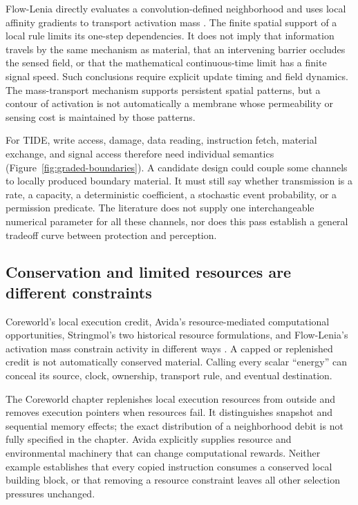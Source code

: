 Flow-Lenia directly evaluates a convolution-defined neighborhood and uses
local affinity gradients to transport activation mass
\citep{Plantec2025}. The finite spatial support of a local rule limits its
one-step dependencies. It does not imply that information travels by the same
mechanism as material, that an intervening barrier occludes the sensed field,
or that the mathematical continuous-time limit has a finite signal speed.
Such conclusions require explicit update timing and field dynamics. The
mass-transport mechanism supports persistent spatial patterns, but a contour
of activation is not automatically a membrane whose permeability or sensing
cost is maintained by those patterns.

For TIDE, write access, damage, data reading, instruction fetch, material
exchange, and signal access therefore need individual semantics
(Figure~\ref{fig:graded-boundaries}). A candidate design could couple some
channels to locally produced boundary material. It must still say whether
transmission is a rate, a capacity, a deterministic coefficient, a stochastic
event probability, or a permission predicate. The literature does not supply
one interchangeable numerical parameter for all these channels, nor does this
pass establish a general tradeoff curve between protection and perception.

\subsection{Conservation and limited resources are different constraints}
Coreworld's local execution credit, Avida's resource-mediated computational
opportunities, Stringmol's two historical resource formulations, and
Flow-Lenia's activation mass constrain activity in different ways
\citep{Rasmussen1991,OfriaWilke2004,StringmolSpec2010,Hickinbotham2021,Plantec2025}.
A capped or replenished credit is not automatically conserved material.
Calling every scalar ``energy'' can conceal its source, clock, ownership,
transport rule, and eventual destination.

The Coreworld chapter replenishes local execution resources from outside and
removes execution pointers when resources fail. It distinguishes snapshot
and sequential memory effects; the exact distribution of a neighborhood
debit is not fully specified in the chapter. Avida explicitly supplies resource
and environmental machinery that can change computational rewards. Neither
example establishes that every copied instruction consumes a conserved local
building block, or that removing a resource constraint leaves all other
selection pressures unchanged.

